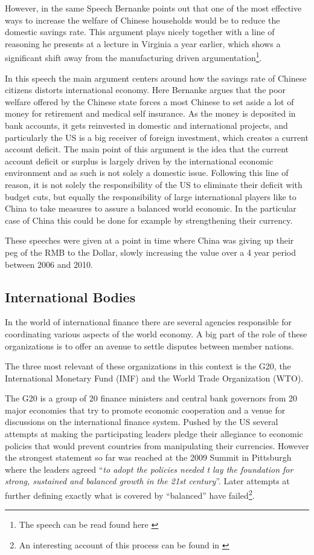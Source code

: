 However, in the same Speech Bernanke points out that one of the most 
effective ways to increase the welfare of Chinese households would be to 
reduce the domestic savings rate. This argument plays nicely together 
with a line of reasoning he presents at a lecture in Virginia a year 
earlier, which shows a significant shift away from the manufacturing 
driven argumentation\footnote{The speech can be read found here 
\cite{Bernanke05}}.

In this speech the main argument centers around how the savings rate 
of Chinese citizens distorts international economy. Here Bernanke argues 
that the poor welfare offered by the Chinese state forces a most Chinese 
to set aside a lot of money for retirement and medical self insurance.  
As the money is deposited in bank accounts, it gets reinvested in 
domestic and international projects, and particularly the US is a big 
receiver of foreign investment, which creates a current account deficit.  
The main point of this argument is the idea that the current account 
deficit or surplus is largely driven by the international economic 
environment and as such is not solely a domestic issue. Following this 
line of reason, it is not solely the responsibility of the US to 
eliminate their deficit with budget cuts, but equally the responsibility 
of large international players like to China to take measures to assure 
a balanced world economic. In the particular case of China this could be 
done for example by strengthening their currency.

These speeches were given at a point in time where China was giving up 
their peg of the RMB to the Dollar, slowly increasing the value over a 4 
year period between 2006 and 2010.

\subsection{International Bodies}

In the world of international finance there are several agencies 
responsible for coordinating various aspects of the world economy. A big 
part of the role of these organizations is to offer an avenue to settle 
disputes between member nations. %

The three most relevant of these organizations in this context is the 
G20, the International Monetary Fund (IMF) and the World Trade 
Organization (WTO).

The G20 is a group of 20 finance ministers and central bank governors 
from 20 major economies that try to promote economic cooperation and a 
venue for discussions on the international finance system. Pushed by the 
US several attempts at making the participating leaders pledge their 
allegiance to economic policies that would prevent countries from 
manipulating their currencies. However the strongest statement so far 
was reached at the 2009 Summit in Pittsburgh where the leaders agreed 
``\textit{to adopt the policies needed t lay the foundation for strong, 
sustained and balanced growth in the 21st century}''. Later attempts at 
further defining exactly what is covered by ``balanced'' have 
failed\footnote{An interesting account of this process can be found in 
\cite{Levy11}}.

